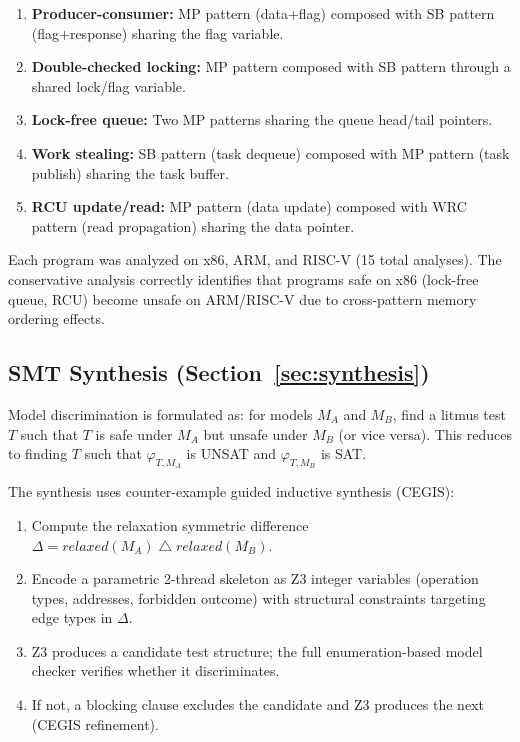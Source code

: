 \documentclass[11pt]{article}
\begin{document}
\begin{enumerate}[nosep]
\item \textbf{Producer-consumer:} MP pattern (data+flag) composed with
  SB pattern (flag+response) sharing the flag variable.
\item \textbf{Double-checked locking:} MP pattern composed with SB
  pattern through a shared lock/flag variable.
\item \textbf{Lock-free queue:} Two MP patterns sharing the queue
  head/tail pointers.
\item \textbf{Work stealing:} SB pattern (task dequeue) composed with
  MP pattern (task publish) sharing the task buffer.
\item \textbf{RCU update/read:} MP pattern (data update) composed with
  WRC pattern (read propagation) sharing the data pointer.
\end{enumerate}

\noindent
Each program was analyzed on x86, ARM, and RISC-V (15 total analyses).
The conservative analysis correctly identifies that programs safe on
x86 (lock-free queue, RCU) become unsafe on ARM/RISC-V due to
cross-pattern memory ordering effects.

\subsection{SMT Synthesis (Section~\ref{sec:synthesis})}

Model discrimination is formulated as: for models $M_A$ and $M_B$,
find a litmus test $T$ such that $T$ is safe under $M_A$ but unsafe
under $M_B$ (or vice versa).  This reduces to finding $T$ such that
$\varphi_{T,M_A}$ is UNSAT and $\varphi_{T,M_B}$ is SAT.

The synthesis uses counter-example guided inductive synthesis (CEGIS):
\begin{enumerate}[nosep]
\item Compute the relaxation symmetric difference
  $\Delta = \mathit{relaxed}(M_A) \mathbin{\triangle} \mathit{relaxed}(M_B)$.
\item Encode a parametric 2-thread skeleton as Z3 integer variables
  (operation types, addresses, forbidden outcome) with structural
  constraints targeting edge types in $\Delta$.
\item Z3 produces a candidate test structure; the full enumeration-based
  model checker verifies whether it discriminates.
\item If not, a blocking clause excludes the candidate and Z3 produces
  the next (CEGIS refinement).
\end{enumerate}
\end{document}

